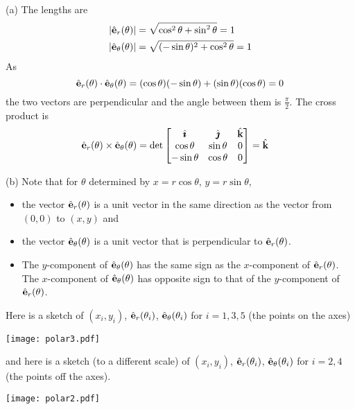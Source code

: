 \begin{solution} 
(a) The lengths are
\begin{align*}
|\hat{\mathbf{e}}_r(\theta)| &= \sqrt{\cos^2\theta+\sin^2\theta} = 1 \\
|\hat{\mathbf{e}}_\theta(\theta)| &= \sqrt{(-\sin\theta)^2+\cos^2\theta} = 1 
\end{align*}
As 
\begin{equation*}
\hat{\mathbf{e}}_r(\theta) \cdot \hat{\mathbf{e}}_\theta(\theta) = (\cos\theta)(-\sin\theta)
                                        +(\sin\theta)(\cos\theta)=0
\end{equation*}
the two vectors are perpendicular and the angle between them is 
$\frac{\pi}{2}$. The cross product is
\begin{align*}
\hat{\mathbf{e}}_r(\theta) \times \hat{\mathbf{e}}_\theta(\theta)
&=\det\left[\begin{matrix}
                  \hat{\pmb{\imath}}  &  \hat{\pmb{\jmath}}        & \hat{\mathbf{k}} \\
           \cos\theta  & \sin\theta  &  0  \\
          -\sin\theta  & \cos\theta  &  0
            \end{matrix}\right] =\hat{\mathbf{k}}
\end{align*}

(b) Note that for $\theta$ determined by $x=r\cos\theta$, $y=r\sin\theta$,
\begin{itemize}\itemsep1pt \parskip0pt  %
\item
the vector $\hat{\mathbf{e}}_r(\theta)$ is a unit vector in the same direction as the
vector from $(0,0)$ to $(x,y)$ and 
\item
the vector $\hat{\mathbf{e}}_\theta(\theta)$ is a unit vector that is perpendicular 
to $\hat{\mathbf{e}}_r(\theta)$. 
\item
The $y$-component of $\hat{\mathbf{e}}_\theta(\theta)$ has the same sign 
as the $x$-component of $\hat{\mathbf{e}}_r(\theta)$.
The $x$-component of $\hat{\mathbf{e}}_\theta(\theta)$ has opposite sign to that of the $y$-component  of $\hat{\mathbf{e}}_r(\theta)$. 
\end{itemize}
Here is a sketch of $(x_i,y_i)$, $\hat{\mathbf{e}}_r(\theta_i)$,
$\hat{\mathbf{e}}_\theta(\theta_i)$ for $i =1,3,5$ (the points on the axes)
\begin{center}
  \texttt{[image: polar3.pdf]}
\end{center}
and here is a sketch (to a different scale) of $(x_i,y_i)$, $\hat{\mathbf{e}}_r(\theta_i)$,
$\hat{\mathbf{e}}_\theta(\theta_i)$ for $i =2,4$ (the points off the axes).
\begin{center}       
  \texttt{[image: polar2.pdf]}
\end{center}
\end{solution}

